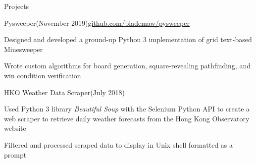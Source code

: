 \documentclass{resume}
\begin{document}
  \begin{rSection}{Projects}
  
    \begin{rSubsectionProject}{Pysweeper}{(November 2019)}{\hyperlink{https://github.com/blademaw/pysweeper}{github.com/blademaw/pysweeper}}
    \item Designed and developed a ground-up Python 3 implementation of grid text-based Minesweeper
    \item Wrote custom algorithms for board generation, square-revealing pathfinding, and win condition verification
    \end{rSubsectionProject}

    \begin{rSubsectionProject}{HKO Weather Data Scraper}{(July 2018)}{}
    \item Used Python 3 library {\em Beautiful Soup} with the Selenium Python API to create a web scraper to retrieve daily weather forecasts from the Hong Kong Observatory website
    \item Filtered and processed scraped data to display in Unix shell formatted as a prompt
    \end{rSubsectionProject}
  
  \end{rSection}
\end{document}
